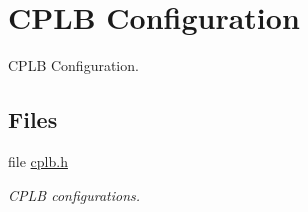 \hypertarget{group__ezkit533__cplb}{}\section{C\+P\+LB Configuration}
\label{group__ezkit533__cplb}


C\+P\+LB Configuration.  


\subsection*{Files}
\begin{DoxyCompactItemize}
\item 
file \mbox{\hyperlink{eZKit533_2include_2cplb_8h}{cplb.\+h}}
\begin{DoxyCompactList}\small\item\em C\+P\+LB configurations. \end{DoxyCompactList}\end{DoxyCompactItemize}
